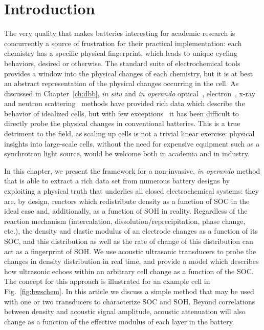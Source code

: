 \section{Introduction}
\label{sec:bw:intro}

The very quality that makes batteries interesting for academic research is concurrently a source of frustration for their practical implementation: each chemistry has a specific physical fingerprint, which leads to unique cycling behaviors, desired or otherwise. The standard suite of electrochemical tools provides a window into the physical changes of each chemistry, but it is at best an abstract representation of the physical changes occurring in the cell. As discussed in Chapter~\ref{ch:dbb}, \textit{in situ} and \textit{in operando} optical~\cite{Ito2011-ir,Gallaway2010-xk}, electron~\cite{Santhanagopalan2014-xh,Karki2014-jj,Radisic2006-zq}, x-ray~\cite{Nelson2012-rq, Chen-Wiegart2013-kh, Liu2013-gi, Marone2013-jh} and neutron scattering~\cite{Manke2007-yj, Armstrong2006-vg, Du2011-up} methods have provided rich data which describe the behavior of idealized cells, but with few exceptions~\cite{gallaway, Senyshyn2012-pz, Rijssenbeek2011-st, Gallaway2015-xy} it has been difficult to directly probe the physical changes in conventional batteries. This is a true detriment to the field, as scaling up cells is not a trivial linear exercise: physical insights into large-scale cells, without the need for expensive equipment such as a synchrotron light source, would be welcome both in academia and in industry.

In this chapter, we present the framework for a non-invasive, \textit{in operando} method that is able to extract a rich data set from numerous battery designs by exploiting a physical truth that underlies all closed electrochemical systems: they are, by design, reactors which redistribute density as a function of SOC in the ideal case and, additionally, as a function of SOH in reality. Regardless of the reaction mechanism (intercalation, dissolution/reprecipitation, phase change, etc.), the density and elastic modulus of an electrode changes as a function of its SOC, and this distribution as well as the rate of change of this distribution can act as a fingerprint of SOH. We use acoustic ultrasonic transducers to probe the changes in density distribution in real time, and provide a model which describes how ultrasonic echoes within an arbitrary cell change as a function of the SOC. The concept for this approach is illustrated for an example cell in Fig.~\ref{fig:bwschem}. In this article we discuss a simple method that may be used with one or two transducers to characterize SOC and SOH. Beyond correlations between density and acoustic signal amplitude, acoustic attenuation will also change as a function of the effective modulus of each layer in the battery.

